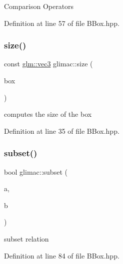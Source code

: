 Comparison Operators 

Definition at line 57 of file B\+Box.\+hpp.

\mbox{\label{namespaceglimac_a66029611b8aa9645c13bb0d68c8f581e}} 
\subsubsection{\texorpdfstring{size()}{size()}}
{\footnotesize\ttfamily const \hyperlink{group__core__types_ga1c47e8b3386109bc992b6c48e91b0be7}{glm\+::vec3} glimac\+::size (\begin{DoxyParamCaption}\item[{const \hyperlink{structglimac_1_1_b_box3f}{B\+Box3f} \&}]{box }\end{DoxyParamCaption})\hspace{0.3cm}{\ttfamily [inline]}}

computes the size of the box 

Definition at line 35 of file B\+Box.\+hpp.

\mbox{\label{namespaceglimac_a1ae484262ea1ae8e3333ea994ea1a299}} 
\subsubsection{\texorpdfstring{subset()}{subset()}}
{\footnotesize\ttfamily bool glimac\+::subset (\begin{DoxyParamCaption}\item[{const \hyperlink{structglimac_1_1_b_box3f}{B\+Box3f} \&}]{a,  }\item[{const \hyperlink{structglimac_1_1_b_box3f}{B\+Box3f} \&}]{b }\end{DoxyParamCaption})\hspace{0.3cm}{\ttfamily [inline]}}

subset relation 

Definition at line 84 of file B\+Box.\+hpp.

